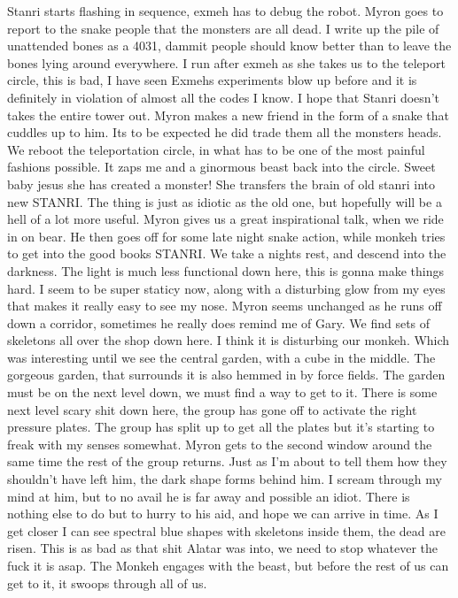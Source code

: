 Stanri starts flashing in sequence, exmeh has to debug the robot. Myron goes to report to the snake people that the monsters are all dead. I write up the pile of unattended bones as a 4031, dammit people should know better than to leave the bones lying around everywhere.\medskip
I run after exmeh as she takes us to the teleport circle, this is bad, I have seen Exmehs experiments blow up before and it is definitely in violation of almost all the codes I know. I hope that Stanri doesn’t takes the entire tower out.\medskip
Myron makes a new friend in the form of a snake that cuddles up to him. Its to be expected he did trade them all the monsters heads.\medskip
We reboot the teleportation circle, in what has to be one of the most painful fashions possible. It zaps me and a ginormous beast back into the circle. Sweet baby jesus she has created a monster! She transfers the brain of old stanri into new STANRI. The thing is just as idiotic as the old one, but hopefully will be a hell of a lot more useful.\medskip
Myron gives us a great inspirational talk, when we ride in on bear. He then goes off for some late night snake action, while monkeh tries to get into the good books STANRI.\medskip
We take a nights rest, and descend into the darkness. The light is much less functional down here, this is gonna make things hard. I seem to be super staticy now, along with a disturbing glow from my eyes that makes it really easy to see my nose.\medskip
Myron seems unchanged as he runs off down a corridor, sometimes he really does remind me of Gary.\medskip
We find sets of skeletons all over the shop down here. I think it is disturbing our monkeh.\medskip
Which was interesting until we see the central garden, with a cube in the middle. The gorgeous garden, that surrounds it is also hemmed in by force fields. The garden must be on the next level down, we must find a way to get to it.\medskip
There is some next level scary shit down here, the group has gone off to activate the right pressure plates. The group has split up to get all the plates but it’s starting to freak with my senses somewhat.\medskip
Myron gets to the second window around the same time the rest of the group returns. Just as I’m about to tell them how they shouldn’t have left him, the dark shape forms behind him. I scream through my mind at him, but to no avail he is far away and possible an idiot. There is nothing else to do but to hurry to his aid, and hope we can arrive in time.\medskip
As I get closer I can see spectral blue shapes with skeletons inside them, the dead are risen. This is as bad as that shit Alatar was into, we need to stop whatever the fuck it is asap. The Monkeh engages with the beast, but before the rest of us can get to it, it swoops through all of us.\medskip
